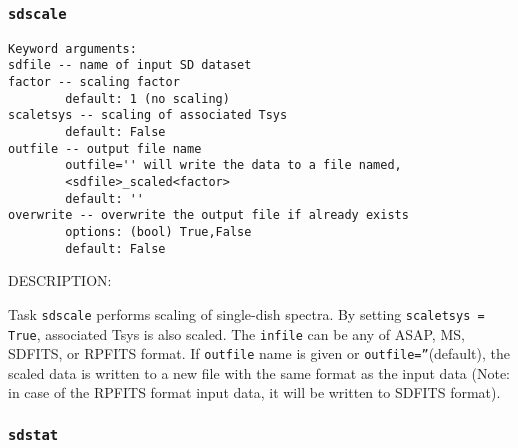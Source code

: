 \subsubsection{{\tt sdscale}}
\label{section:sd.sdtasks.tasks.sdscale}

\begin{verbatim}
Keyword arguments:
sdfile -- name of input SD dataset
factor -- scaling factor
        default: 1 (no scaling)
scaletsys -- scaling of associated Tsys
        default: False
outfile -- output file name
        outfile='' will write the data to a file named,
        <sdfile>_scaled<factor>
        default: ''
overwrite -- overwrite the output file if already exists
        options: (bool) True,False
        default: False
\end{verbatim}

    DESCRIPTION:

    Task {\tt sdscale} performs scaling of single-dish spectra.
    By setting {\tt scaletsys = True}, associated Tsys is also scaled.
    The {\tt infile} can be any of ASAP, MS, SDFITS, or RPFITS format.
    If {\tt outfile} name is given or {\tt outfile=''}(default), the scaled data is written
    to a new file with the same format as the input data (Note: in case of the
    RPFITS format input data, it will be written to SDFITS format).

\subsubsection{{\tt sdstat}}
\label{section:sd.sdtasks.tasks.sdstat}


